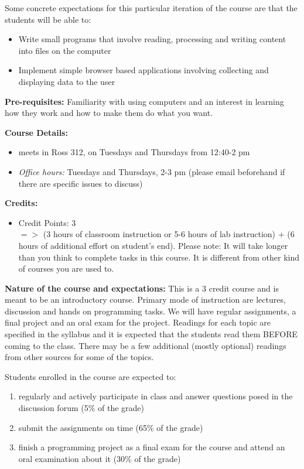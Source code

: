 \documentclass[11pt,a4paper]{article}
\begin{document}
Some concrete expectations for this particular iteration of the course are that the students will be able to:
\begin{itemize}
\item Write small programs that involve reading, processing and writing content into files on the computer
\item Implement simple browser based applications involving collecting and displaying data to the user
\end{itemize}


\textbf{\large Pre-requisites:}
Familiarity with using computers and an interest in learning how they work and how to make them do what you want. 

\textbf{\large Course Details:}
\begin{itemize}
\item  meets in Ross 312, on Tuesdays and Thursdays from 12:40-2 pm
\item \textit{Office hours:} Tuesdays and Thursdays, 2-3 pm (please email beforehand if there are specific issues to discuss)
\end{itemize}

\textbf{\large Credits:} 
\begin{itemize}\vspace*{-.8\baselineskip}\itemsep0ex
\item Credit Points: 3
\\ $=>$ (3 hours of classroom instruction or 5-6 hours of lab instruction) + (6 hours of additional effort on student's end). Please note: It will take longer than you think to complete tasks in this course. It is different from other kind of courses you are  used to.
\end{itemize}


\bigskip \textbf{Nature of the course and expectations:} This is a 3 credit course and is meant to be an introductory course. Primary mode of instruction are lectures, discussion and hands on programming tasks. We will have regular assignments, a final project and an oral exam for the project. Readings for each topic are specified in the syllabus and it is expected that the students read them BEFORE coming to the class. There may be a few additional (mostly optional) readings from other sources for some of the topics. 

Students enrolled in the course are expected to:
\begin{enumerate}
\item regularly and actively participate in class and answer questions posed in the discussion forum (5\% of the grade)
\item submit the assignments on time (65\% of the grade)
\item finish a programming project as a final exam for the course and attend an oral examination about it (30\% of the grade)
\end{enumerate}
\end{document}
